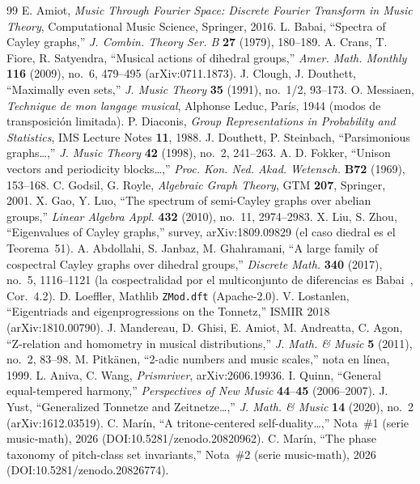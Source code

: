 \documentclass[11pt]{article}
\newcommand{\lean}[1]{\texttt{#1}}
\begin{document}
\begin{thebibliography}{99}
 E. Amiot, \emph{Music Through Fourier Space: Discrete Fourier Transform in Music Theory},
  Computational Music Science, Springer, 2016.
 L. Babai, ``Spectra of Cayley graphs,'' \emph{J. Combin. Theory Ser. B} \textbf{27} (1979),
  180--189.
 A. Crans, T. Fiore, R. Satyendra, ``Musical actions of dihedral groups,'' \emph{Amer. Math.
  Monthly} \textbf{116} (2009), no.~6, 479--495 (arXiv:0711.1873).
 J. Clough, J. Douthett, ``Maximally even sets,'' \emph{J. Music Theory}
  \textbf{35} (1991), no.~1/2, 93--173.
 O. Messiaen, \emph{Technique de mon langage musical}, Alphonse Leduc, Par\'is, 1944
  (modos de transposici\'on limitada).
 P. Diaconis, \emph{Group Representations in Probability and Statistics}, IMS Lecture Notes
  \textbf{11}, 1988.
 J. Douthett, P. Steinbach, ``Parsimonious graphs\dots,'' \emph{J. Music Theory} \textbf{42}
  (1998), no.~2, 241--263.
 A. D. Fokker, ``Unison vectors and periodicity blocks\dots,'' \emph{Proc. Kon. Ned. Akad.
  Wetensch.} \textbf{B72} (1969), 153--168.
 C. Godsil, G. Royle, \emph{Algebraic Graph Theory}, GTM \textbf{207}, Springer, 2001.
 X. Gao, Y. Luo, ``The spectrum of semi-Cayley graphs over abelian groups,'' \emph{Linear
  Algebra Appl.} \textbf{432} (2010), no.~11, 2974--2983.
 X. Liu, S. Zhou, ``Eigenvalues of Cayley graphs,'' survey, arXiv:1809.09829
  (el caso diedral es el Teorema~51).
 A. Abdollahi, S. Janbaz, M. Ghahramani, ``A large family of cospectral Cayley graphs over
  dihedral groups,'' \emph{Discrete Math.} \textbf{340} (2017), no.~5, 1116--1121 (la cospectralidad por el
  multiconjunto de diferencias es Babai~\cite{Babai}, Cor.~4.2).
 D. Loeffler, Mathlib \lean{ZMod.dft} (Apache-2.0).
 V. Lostanlen, ``Eigentriads and eigenprogressions on the Tonnetz,'' ISMIR 2018
  (arXiv:1810.00790).
 J. Mandereau, D. Ghisi, E. Amiot, M. Andreatta, C. Agon, ``Z-relation and homometry in
  musical distributions,'' \emph{J. Math. \& Music} \textbf{5} (2011), no.~2, 83--98.
 M. Pitk\"anen, ``2-adic numbers and music scales,'' nota en l\'inea, 1999.
 L. Aniva, C. Wang, \emph{Prismriver}, arXiv:2606.19936.
 I. Quinn, ``General equal-tempered harmony,'' \emph{Perspectives of New Music}
  \textbf{44}--\textbf{45} (2006--2007).
 J. Yust, ``Generalized Tonnetze and Zeitnetze\dots,'' \emph{J. Math. \& Music} \textbf{14}
  (2020), no.~2 (arXiv:1612.03519).
 C. Mar\'in, ``A tritone-centered self-duality\dots,'' Nota~\#1 (serie music-math), 2026
  (DOI:10.5281/zenodo.20820962).
 C. Mar\'in, ``The phase taxonomy of pitch-class set invariants,'' Nota~\#2 (serie
  music-math), 2026 (DOI:10.5281/zenodo.20826774).
\end{thebibliography}
\end{document}
